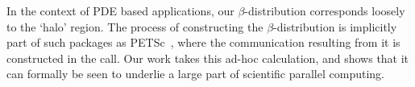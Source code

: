 \begin{remark}
  In the context of \ac{PDE} based applications, our
  $\beta$-distribution corresponds loosely to the `halo' region. The
  process of constructing the $\beta$-distribution is implicitly part of
  such packages as PETSc~\cite{GrSm:petsc}, where the communication
  resulting from it is constructed in the
   call. Our work takes this ad-hoc calculation, and
  shows that it can formally be seen to underlie a large part of
  scientific parallel computing.
\end{remark}
